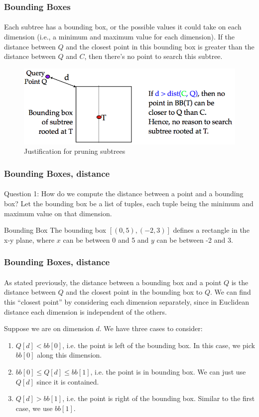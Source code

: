 \documentclass{beamer}                             %
\begin{document}
\begin{frame}
\frametitle{Bounding Boxes}
\framesubtitle{}
Each subtree has a \alert{bounding box}, or the possible values it could take
on each dimension (i.e., a minimum and maximum value for each dimension).
If the distance between \( Q \) and the closest point in this bounding box
is greater than the distance between \( Q \) and \( C \), then there's
no point to search this subtree.
\begin{figure}[h!]
  \centering
  \includegraphics[scale=0.4]{nearest_neighbor_query.png}
  \caption{Justification for pruning subtrees}
\end{figure}
\end{frame}

\begin{frame}
\frametitle{Bounding Boxes, distance}
\framesubtitle{}
Question 1: How do we compute the distance between a point and a bounding box?
Let the bounding box be a list of tuples, each tuple being the minimum and
maximum value on that dimension.

\begin{exampleblock}{Bounding Box}
  The bounding box \( [(0, 5), (-2, 3)] \) defines a rectangle in the x-y plane,
  where \( x \) can be between 0 and 5 and \( y \) can be between -2 and 3.
\end{exampleblock}
\end{frame}

\begin{frame}
\frametitle{Bounding Boxes, distance}
\framesubtitle{}
As stated previously, the distance between a bounding box and a point \( Q \)
is the distance between \( Q \) and the closest point in the bounding box
to \( Q \). We can find this \enquote{closest point} by considering
each dimension separately, since in Euclidean distance each dimension
is independent of the others. \pause

Suppose we are on dimension \( d \). We have three cases to consider:
\begin{enumerate}
  \item \( Q[d] < bb[0] \), i.e. the point is left of the bounding box.
    In this case, we pick \( bb[0] \) along this dimension.
  \item \( bb[0] \leq Q[d] \leq bb[1] \), i.e. the point is in bounding box.
    We can just use \( Q[d] \) since it is contained.
  \item \( Q[d] > bb[1] \), i.e. the point is right of the bounding box.
    Similar to the first case, we use \( bb[1] \). 
\end{enumerate}

\end{frame}
\end{document}
